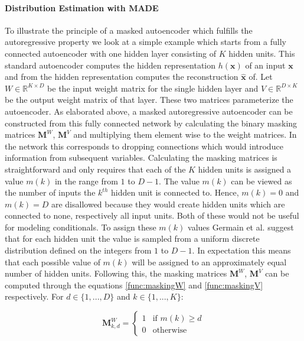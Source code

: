 \documentclass[11pt,titlepage,oneside,openany]{book}
\begin{document}
\paragraph{Distribution Estimation with MADE}
To illustrate the principle of a masked autoencoder which fulfills the autoregressive property we look at a simple example which starts from a fully connected autoencoder with one hidden layer consisting of $K$ hidden units. This standard autoencoder computes the hidden representation $h(\pmb{x})$ of an input $\pmb{x}$ and from the hidden representation computes the reconstruction $\hat{\pmb{x}}$ of. Let $W \in \mathbb{R}^{K \times D}$ be the input weight matrix for the single hidden layer and $V \in \mathbb{R}^{D \times K}$ be the output weight matrix of that layer. These two matrices parameterize the autoencoder. As elaborated above, a masked autoregressive autoencoder can be constructed from this fully connected network by calculating the binary masking matrices $\mathbf{M}^W$, $\mathbf{M}^V$ and multiplying them element wise to the weight matrices. In the network this corresponds to dropping connections which would introduce information from subsequent variables. Calculating the masking matrices is straightforward and only requires that each of the $K$ hidden units is assigned a value $m(k)$ in the range from $1$ to $D-1$. The value $m(k)$ can be viewed as the number of inputs the $k^{th}$ hidden unit is connected to. Hence, $m(k)=0$ and $m(k)=D$ are disallowed because they would create hidden units which are connected to none, respectively all input units. Both of these would not be useful for modeling conditionals. To assign these $m(k)$ values Germain et al. \cite{germain_made_nodate} suggest that for each hidden unit the value is sampled from a uniform discrete distribution defined on the integers from $1$ to $D-1$. In expectation this means that each possible value of $m(k)$ will be assigned to an approximately equal number of hidden units. Following this, the masking matrices $\mathbf{M}^W$, $\mathbf{M}^V$ can be computed through the equations \ref{func:maskingW} and \ref{func:maskingV} respectively. For $d \in \{1,...,D\}$ and $k \in \{1,...,K\}$:

\begin{equation}
	\label{func:maskingW}
	\mathbf{M}_{k,d}^W = 
	\begin{cases}
		1 & \text{if $m(k) \geq d$}\\
		0 & \text{otherwise}
	\end{cases}
\end{equation}
\end{document}
